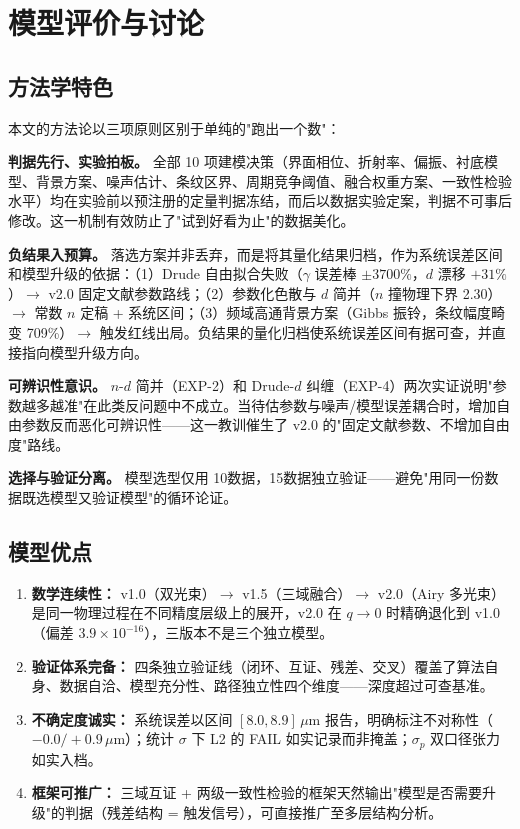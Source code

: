 \section{模型评价与讨论}

\subsection{方法学特色}

本文的方法论以三项原则区别于单纯的"跑出一个数"：

\textbf{判据先行、实验拍板。} 全部 10 项建模决策（界面相位、折射率、偏振、衬底模型、背景方案、噪声估计、条纹区界、周期竞争阈值、融合权重方案、一致性检验水平）均在实验前以预注册的定量判据冻结，而后以数据实验定案，判据不可事后修改。这一机制有效防止了"试到好看为止"的数据美化。

\textbf{负结果入预算。} 落选方案并非丢弃，而是将其量化结果归档，作为系统误差区间和模型升级的依据：（1）Drude 自由拟合失败（$\gamma$ 误差棒 $\pm3700\%$，$d$ 漂移 $+31\%$）$\to$ v2.0 固定文献参数路线；（2）参数化色散与 $d$ 简并（$n$ 撞物理下界 2.30）$\to$ 常数 $n$ 定稿 + 系统区间；（3）频域高通背景方案（Gibbs 振铃，条纹幅度畸变 709\%）$\to$ 触发红线出局。负结果的量化归档使系统误差区间有据可查，并直接指向模型升级方向。

\textbf{可辨识性意识。} $n$-$d$ 简并（EXP-2）和 Drude-$d$ 纠缠（EXP-4）两次实证说明"参数越多越准"在此类反问题中不成立。当待估参数与噪声/模型误差耦合时，增加自由参数反而恶化可辨识性——这一教训催生了 v2.0 的"固定文献参数、不增加自由度"路线。

\textbf{选择与验证分离。} 模型选型仅用 10\degree 数据，15\degree 数据独立验证——避免"用同一份数据既选模型又验证模型"的循环论证。

\subsection{模型优点}

\begin{enumerate}[itemindent=2em]
\item \textbf{数学连续性：} v1.0（双光束）$\to$ v1.5（三域融合）$\to$ v2.0（Airy 多光束）是同一物理过程在不同精度层级上的展开，v2.0 在 $q\to0$ 时精确退化到 v1.0（偏差 $3.9\times 10^{-16}$），三版本不是三个独立模型。

\item \textbf{验证体系完备：} 四条独立验证线（闭环、互证、残差、交叉）覆盖了算法自身、数据自洽、模型充分性、路径独立性四个维度——深度超过可查基准。

\item \textbf{不确定度诚实：} 系统误差以区间 $[8.0,8.9]\,\mu$m 报告，明确标注不对称性（$-0.0/+0.9\,\mu$m）；统计 $\sigma$ 下 L2 的 FAIL 如实记录而非掩盖；$\sigma_p$ 双口径张力如实入档。

\item \textbf{框架可推广：} 三域互证 + 两级一致性检验的框架天然输出"模型是否需要升级"的判据（残差结构 = 触发信号），可直接推广至多层结构分析。
\end{enumerate}

